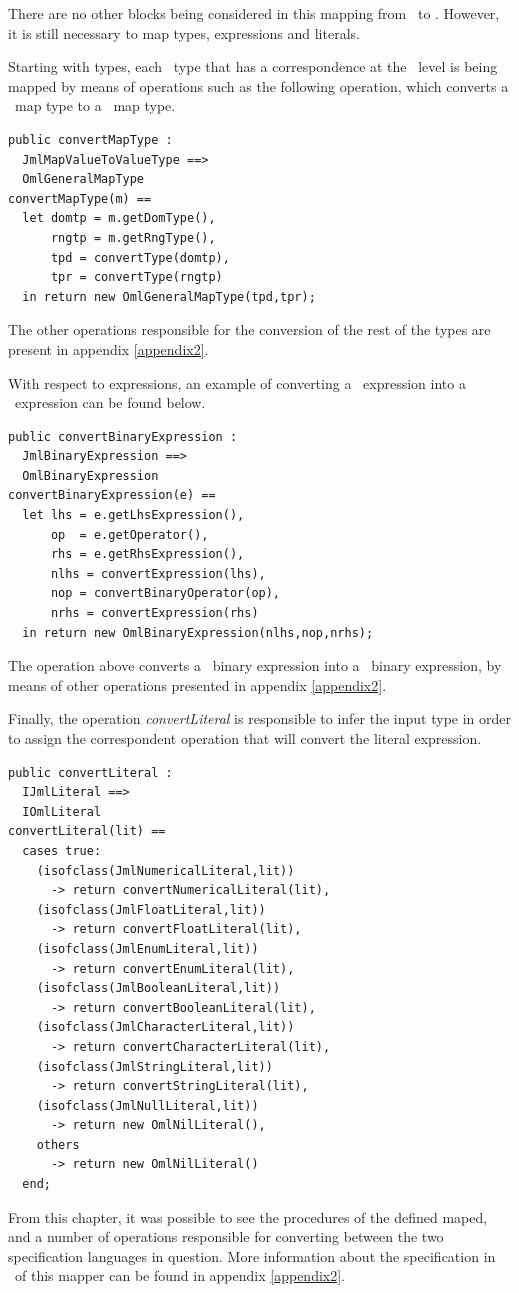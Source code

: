 There are no other blocks being considered in this mapping from \jml\ to \vpp. However, it is still necessary to map types, expressions and literals. 

Starting with types, each \jml\ type that has a correspondence at the \vpp\ level is being mapped by means of operations such as the following operation, which converts a \jml\ map type to a \vpp\ map type.

\bigskip
\begin{lstlisting}
public convertMapType :
  JmlMapValueToValueType ==>
  OmlGeneralMapType
convertMapType(m) ==
  let domtp = m.getDomType(),
      rngtp = m.getRngType(),
	  tpd = convertType(domtp),
	  tpr = convertType(rngtp)
  in return new OmlGeneralMapType(tpd,tpr);
\end{lstlisting}
\bigskip

The other operations responsible for the conversion of the rest of the types are present in appendix \ref{appendix2}.

With respect to expressions, an example of converting a \jml\ expression into a \vpp\ expression can be found below.

\bigskip
\begin{lstlisting}
public convertBinaryExpression :
  JmlBinaryExpression ==>
  OmlBinaryExpression
convertBinaryExpression(e) ==
  let lhs = e.getLhsExpression(),
	  op  = e.getOperator(),
	  rhs = e.getRhsExpression(),
	  nlhs = convertExpression(lhs),
	  nop = convertBinaryOperator(op),
	  nrhs = convertExpression(rhs)
  in return new OmlBinaryExpression(nlhs,nop,nrhs);
\end{lstlisting}
\bigskip

The operation above converts a \jml\ binary expression into a \vpp\ binary expression, by means of other operations presented in appendix \ref{appendix2}.

Finally, the operation \textit{convertLiteral} is responsible to infer the input type in order to  assign the correspondent operation that will convert the literal expression.

\bigskip
\begin{lstlisting}
public convertLiteral :
  IJmlLiteral ==>
  IOmlLiteral
convertLiteral(lit) == 
  cases true:
    (isofclass(JmlNumericalLiteral,lit))
	  -> return convertNumericalLiteral(lit),
    (isofclass(JmlFloatLiteral,lit))
	  -> return convertFloatLiteral(lit),
    (isofclass(JmlEnumLiteral,lit))
	  -> return convertEnumLiteral(lit),
    (isofclass(JmlBooleanLiteral,lit))
	  -> return convertBooleanLiteral(lit),
    (isofclass(JmlCharacterLiteral,lit))
	  -> return convertCharacterLiteral(lit),
    (isofclass(JmlStringLiteral,lit))
	  -> return convertStringLiteral(lit),
	(isofclass(JmlNullLiteral,lit))
	  -> return new OmlNilLiteral(),
	others
	  -> return new OmlNilLiteral()
  end;
\end{lstlisting}
\bigskip


From this chapter, it was possible to see the procedures of the defined maped, and a number of operations responsible for converting between the two specification languages in question. More information about the specification in \vpp\ of this mapper can be found in appendix \ref{appendix2}.

